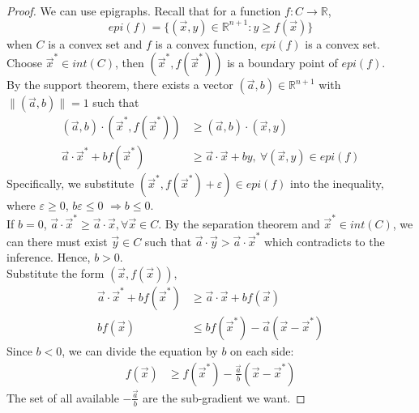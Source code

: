 \documentclass[11pt,a4paper]{article}
\begin{document}
\begin{proof}
    We can use epigraphs. Recall that for a function $f: C \rightarrow \mathbb{R}$, $$epi(f)=\{(\vec{x},y)\in \mathbb{R}^{n+1}: y\geq f(\vec{x})\}$$
    when $C$ is a convex set and $f$ is a convex function, $epi(f)$ is a convex set.\\
    Choose $\vec{x}^*\in int(C)$, then $\left(\vec{x}^*,f(\vec{x}^*)\right)$ is a boundary point of $epi(f)$.\\
    By the support theorem, there exists a vector $(\vec{a},b)\in \mathbb{R}^{n+1}$ with $\|(\vec{a},b)\|=1$ such that
    \begin{equation}
        \begin{aligned}
            (\vec{a},b)\cdot \left(\vec{x}^*,f(\vec{x}^*)\right)&\geq (\vec{a},b)\cdot \left(\vec{x},y\right)\\
            \vec{a}\cdot \vec{x}^*+ b f(\vec{x}^*)&\geq \vec{a}\cdot \vec{x}+ by,\ \forall \left(\vec{x},y\right)\in epi(f)
        \end{aligned}
        \nonumber
    \end{equation}
    Specifically, we substitute $(\vec{x}^*,f(\vec{x}^*)+\varepsilon)\in epi(f)$ into the inequality, where $\varepsilon\geq 0$, $b\varepsilon\leq 0$ $\Rightarrow b\leq 0$.\\
    If $b=0$, $\vec{a}\cdot \vec{x}^*\geq \vec{a}\cdot \vec{x},\forall \vec{x}\in C$. By the separation theorem and $\vec{x}^*\in int(C)$, we can there must exist $\vec{y}\in C$ such that $\vec{a}\cdot \vec{y}>\vec{a}\cdot \vec{x}^*$ which contradicts to the inference. Hence, $b>0$.\\
    Substitute the form $(\vec{x},f(\vec{x}))$,
    \begin{equation}
        \begin{aligned}
            \vec{a}\cdot \vec{x}^*+ b f(\vec{x}^*)&\geq \vec{a}\cdot \vec{x}+ bf(\vec{x})\\
            bf(\vec{x})&\leq bf(\vec{x}^*)-\vec{a}(\vec{x}-\vec{x}^*)
        \end{aligned}
        \nonumber
    \end{equation}
    Since $b<0$, we can divide the equation by $b$ on each side:
    \begin{equation}
        \begin{aligned}
            f(\vec{x})&\geq f(\vec{x}^*)-\frac{\vec{a}}{b}(\vec{x}-\vec{x}^*)
        \end{aligned}
        \nonumber
    \end{equation}
    The set of all available $-\frac{\vec{a}}{b}$ are the sub-gradient we want.
\end{proof}
\end{document}
